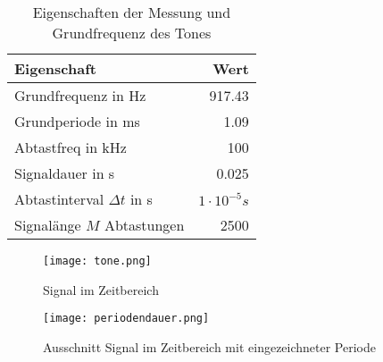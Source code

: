 \begin{table}[H]
\centering
\begin{tabular}{l|r}
Eigenschaft & Wert \\ \hline
Grundfrequenz in Hz & 917.43\\
Grundperiode in ms & 1.09\\
Abtastfreq in kHz & 100\\
Signaldauer in s & 0.025\\
Abtastinterval $\Delta t$ in s & $1 \cdot 10^{-5}s$\\
Signalänge $M$ Abtastungen & 2500\\
\end{tabular}
\caption{Eigenschaften der Messung und Grundfrequenz des Tones}
\label{tab:Eigenschaften}
\end{table}

\begin{figure}[H]
\centering
\texttt{[image: tone.png]}
\caption{Signal im Zeitbereich}
\label{img:SIGNALZEITBEREICH}
\end{figure}

\begin{figure}[H]
\centering
\texttt{[image: periodendauer.png]}
\caption{Ausschnitt Signal im Zeitbereich mit eingezeichneter Periode}
\label{img:SIGNALPERIODE}
\end{figure}

